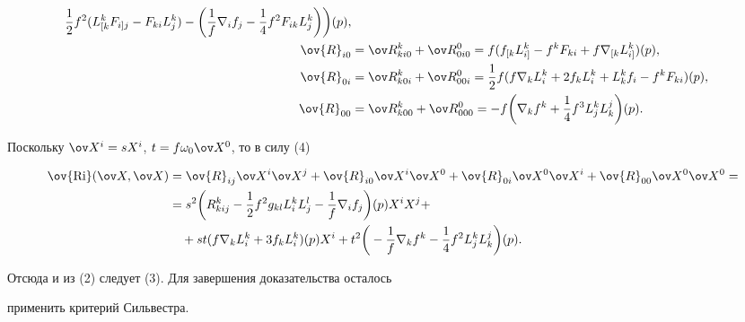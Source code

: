 \begin{pf}
\begin{equation}
\begin{split}
\frac{1}{2}f^{2}(L^{k}_{[k}F_{i]j}-F_{ki}L^{k}_{j})-


\bigg(\frac{1}{f}\nabla_{i}f_{j}-\frac{1}{4}f^{2}F_{ik}L^{k}_{j}


\bigg)\bigg)(p),\\




\ov{R}_{i0}&=\ov R^{k}_{ki0}+\ov R^{0}_{0i0}


=f(f_{[k}L_{i]}^{k}-f^{k}F_{ki}+f\nabla_{[k}L_{i]}^{k})(p),\\




\ov{R}_{0i}&=\ov R^{k}_{k0i}+\ov R^{0}_{00i}=


\frac{1}{2}f(f\nabla_{k}L_{i}^{k}+ 2f_{k}L^{k}_{i}+


L_{k}^{k}f_{i}-f^{k}F_{ki})(p),\\




\ov{R}_{00}&=\ov R^{k}_{k00}+\ov R^{0}_{000}=


-f\bigg(\nabla_{k}f^{k}+\frac{1}{4}f^{3}L^{k}_{j}L^{j}_{k}\bigg)(p).






\end{split}


\end{equation}


Поскольку $\ov X^{i}=sX^{i}$, $t=f\omega_{0}\ov X^{0}$, то в силу (4)


\begin{align*}


\ov{\Ri}(\ov X,\ov X)&=


\ov{R}_{ij}\ov X^{i}\ov X^{j}+\ov{R}_{i0}\ov X^{i}\ov X^{0}+


\ov{R}_{0i}\ov X^{0}\ov X^{i}+\ov{R}_{00}\ov X^{0}\ov X^{0}=\\


%


&=s^{2}\bigg(R^{k}_{kij}-\frac{1}{2}f^{2}g_{kl}L^{k}_{i}L^{l}_{j}


-\frac{1}{f}\nabla_{i}f_{j}\bigg)(p)X^{i}X^{j}+\\


%


&\quad+st(f\nabla_{k}L^{k}_{i}+3f_{k}L^{k}_{i})(p)X^{i}+


t^{2}\bigg(-\frac{1}{f}\nabla_{k}f^{k}-\frac{1}{4}f^{2}L^{k}_{j}L^{j}_{k}


\bigg)(p).


\end{align*}


Отсюда и из (2) следует (3). Для завершения доказательства осталось


применить критерий Сильвестра.


\end{pf}






